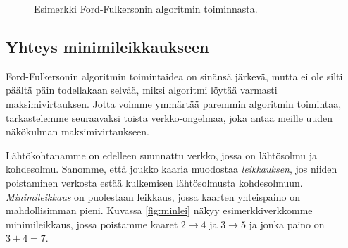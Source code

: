 \begin{figure}
\begin{center}
\end{center}
\caption{Esimerkki Ford-Fulkersonin algoritmin toiminnasta.}
\label{fig:floesi}
\end{figure}

\subsection{Yhteys minimileikkaukseen}

Ford-Fulkersonin algoritmin toimintaidea on sinänsä järkevä,
mutta ei ole silti päältä päin todellakaan selvää,
miksi algoritmi löytää varmasti maksimivirtauksen.
Jotta voimme ymmärtää paremmin algoritmin toimintaa,
tarkastelemme seuraavaksi toista verkko-ongelmaa,
joka antaa meille uuden näkökulman maksimivirtaukseen.

Lähtökohtanamme on edelleen suunnattu verkko,
jossa on lähtösolmu ja kohdesolmu.
Sanomme, että joukko kaaria muodostaa \emph{leikkauksen},
jos niiden poistaminen verkosta estää kulkemisen
lähtösolmusta kohdesolmuun.
\emph{Minimileikkaus} on puolestaan leikkaus,
jossa kaarten yhteispaino on mahdollisimman pieni.
Kuvassa \ref{fig:minlei} näkyy esimerkkiverkkomme minimileikkaus,
jossa poistamme kaaret $2 \rightarrow 4$ ja $3 \rightarrow 5$
ja jonka paino on $3+4=7$.

